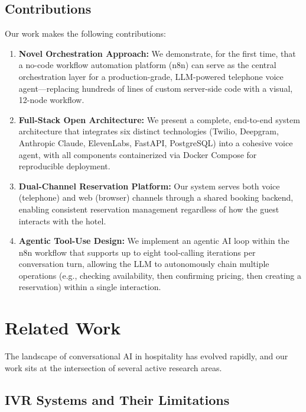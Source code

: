 \documentclass[conference]{IEEEtran}
\begin{document}
\subsection{Contributions}

Our work makes the following contributions:

\begin{enumerate}
    \item \textbf{Novel Orchestration Approach:} We demonstrate, for the first time, that a no-code workflow automation platform (n8n) can serve as the central orchestration layer for a production-grade, LLM-powered telephone voice agent---replacing hundreds of lines of custom server-side code with a visual, 12-node workflow.
    
    \item \textbf{Full-Stack Open Architecture:} We present a complete, end-to-end system architecture that integrates six distinct technologies (Twilio, Deepgram, Anthropic Claude, ElevenLabs, FastAPI, PostgreSQL) into a cohesive voice agent, with all components containerized via Docker Compose for reproducible deployment.
    
    \item \textbf{Dual-Channel Reservation Platform:} Our system serves both voice (telephone) and web (browser) channels through a shared booking backend, enabling consistent reservation management regardless of how the guest interacts with the hotel.
    
    \item \textbf{Agentic Tool-Use Design:} We implement an agentic AI loop within the n8n workflow that supports up to eight tool-calling iterations per conversation turn, allowing the LLM to autonomously chain multiple operations (e.g., checking availability, then confirming pricing, then creating a reservation) within a single interaction.
\end{enumerate}

\section{Related Work}

The landscape of conversational AI in hospitality has evolved rapidly, and our work sits at the intersection of several active research areas.

\subsection{IVR Systems and Their Limitations}
\end{document}

